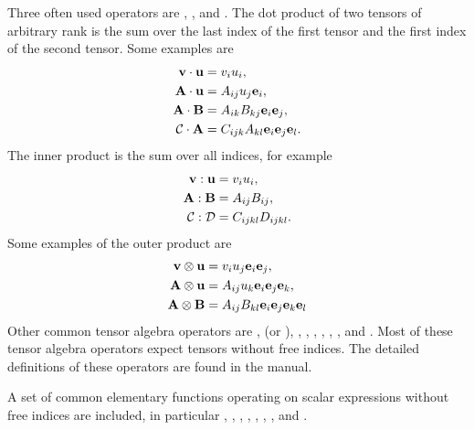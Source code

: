 Three often used operators are ,
, and .
The dot product of two tensors of arbitrary rank is the sum over the
last index of the first tensor and the first index of the second
tensor.  Some examples are
\begin{align}
\mathbf{v} \cdot \mathbf{u} &= v_i u_i, \\
\mathbf{A} \cdot \mathbf{u} &= A_{ij} u_j \mathbf{e}_i, \\
\mathbf{A} \cdot \mathbf{B} &= A_{ik} B_{kj} \mathbf{e}_i \mathbf{e}_j, \\
\mathcal{C} \cdot \mathbf{A} &= C_{ijk} A_{kl} \mathbf{e}_i \mathbf{e}_j \mathbf{e}_l.
\end{align}
The inner product is the sum over all indices, for example
\begin{align}
\mathbf{v} : \mathbf{u} &= v_i u_i, \\
\mathbf{A} : \mathbf{B} &= A_{ij} B_{ij}, \\
\mathcal{C} : \mathcal{D} &= C_{ijkl} D_{ijkl}.
\end{align}
Some examples of the outer product are
\begin{align}
\mathbf{v} \otimes \mathbf{u} &= v_i u_j \mathbf{e}_i \mathbf{e}_j, \\
\mathbf{A} \otimes \mathbf{u} &= A_{ij} u_k \mathbf{e}_i \mathbf{e}_j \mathbf{e}_k, \\
\mathbf{A} \otimes \mathbf{B} &= A_{ij} B_{kl} \mathbf{e}_i \mathbf{e}_j \mathbf{e}_k \mathbf{e}_l
\end{align}
Other common tensor algebra operators are
,  (or ),
, , ,
, , ,
and . Most of these tensor algebra operators expect
tensors without free indices. The detailed definitions of these
operators are found in the manual.

A set of common elementary functions operating on scalar expressions
without free indices are included, in particular ,
,
, , ,
, , and .

